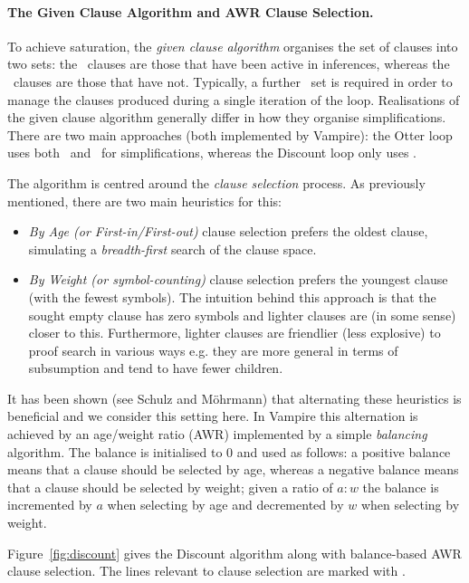 \documentclass{llncs}
\newcommand{\sandm}{Schulz and M{\"{o}}hrmann}
\begin{document}
\paragraph{The Given Clause Algorithm and AWR Clause Selection.}
To achieve saturation, the \emph{given clause algorithm} organises the set of clauses into two sets: the \Active\ clauses are those that have been active in inferences, whereas the \Passive\ clauses are those that have not. Typically, a further \Unprocessed\ set is required in order to manage the clauses produced during a single iteration of the loop. 
%
Realisations of the given clause algorithm generally differ in how they organise simplifications. There are two main approaches (both implemented by Vampire): the Otter loop uses both \Active\ and \Passive\ for simplifications, whereas the Discount loop only uses \Active. 

The algorithm is centred around the \emph{clause selection} process. As previously mentioned, there are two main heuristics for this:
\begin{itemize}
	\item \emph{By Age (or First-in/First-out)} clause selection prefers the oldest clause, simulating a \emph{breadth-first} search of the clause space.
	\item \emph{By Weight (or symbol-counting)} clause selection prefers the youngest clause (with the fewest symbols). The intuition behind this approach is that the sought empty clause has zero symbols and lighter clauses are (in some sense) closer to this. Furthermore, lighter clauses are friendlier (less explosive) to proof search in various ways e.g. they are more general in terms of subsumption and tend to have fewer children.
\end{itemize}
It has been shown (see \sandm{}) that alternating these heuristics is beneficial and we consider this setting here. In Vampire this alternation is achieved by an age/weight ratio (AWR) implemented by a simple \emph{balancing} algorithm. The balance is initialised to 0 and used as follows: a positive balance means that a clause should be selected by age, whereas a negative balance means that a clause should be selected by weight; given a ratio of $a:w$ the balance is incremented by $a$ when selecting by age and decremented by $w$ when selecting by weight.

Figure~\ref{fig:discount} gives the Discount algorithm along with balance-based AWR clause selection. The lines relevant to clause selection are marked with \Mark.
\end{document}
